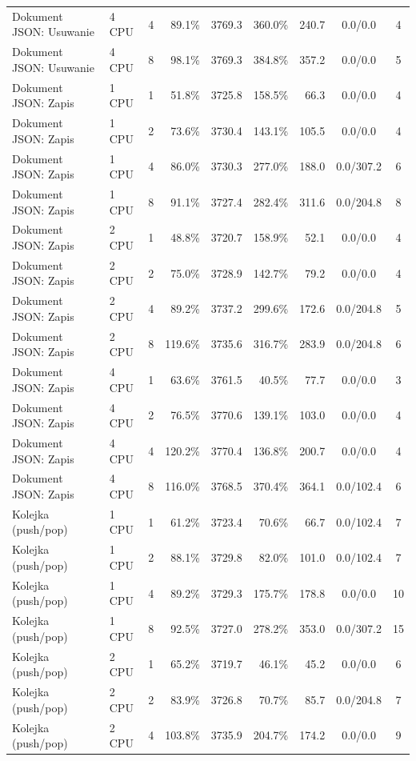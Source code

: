 \begin{table}[ht]
{\begin{tabular}{llcrrrrcc}
Dokument JSON: Usuwanie & 4 CPU & 4 & 89.1\% & 3769.3 & 360.0\% & 240.7 & 0.0/0.0 & 4 \\
Dokument JSON: Usuwanie & 4 CPU & 8 & 98.1\% & 3769.3 & 384.8\% & 357.2 & 0.0/0.0 & 5 \\
Dokument JSON: Zapis & 1 CPU & 1 & 51.8\% & 3725.8 & 158.5\% & 66.3 & 0.0/0.0 & 4 \\
Dokument JSON: Zapis & 1 CPU & 2 & 73.6\% & 3730.4 & 143.1\% & 105.5 & 0.0/0.0 & 4 \\
Dokument JSON: Zapis & 1 CPU & 4 & 86.0\% & 3730.3 & 277.0\% & 188.0 & 0.0/307.2 & 6 \\
Dokument JSON: Zapis & 1 CPU & 8 & 91.1\% & 3727.4 & 282.4\% & 311.6 & 0.0/204.8 & 8 \\
Dokument JSON: Zapis & 2 CPU & 1 & 48.8\% & 3720.7 & 158.9\% & 52.1 & 0.0/0.0 & 4 \\
Dokument JSON: Zapis & 2 CPU & 2 & 75.0\% & 3728.9 & 142.7\% & 79.2 & 0.0/0.0 & 4 \\
Dokument JSON: Zapis & 2 CPU & 4 & 89.2\% & 3737.2 & 299.6\% & 172.6 & 0.0/204.8 & 5 \\
Dokument JSON: Zapis & 2 CPU & 8 & 119.6\% & 3735.6 & 316.7\% & 283.9 & 0.0/204.8 & 6 \\
Dokument JSON: Zapis & 4 CPU & 1 & 63.6\% & 3761.5 & 40.5\% & 77.7 & 0.0/0.0 & 3 \\
Dokument JSON: Zapis & 4 CPU & 2 & 76.5\% & 3770.6 & 139.1\% & 103.0 & 0.0/0.0 & 4 \\
Dokument JSON: Zapis & 4 CPU & 4 & 120.2\% & 3770.4 & 136.8\% & 200.7 & 0.0/0.0 & 4 \\
Dokument JSON: Zapis & 4 CPU & 8 & 116.0\% & 3768.5 & 370.4\% & 364.1 & 0.0/102.4 & 6 \\
Kolejka (push/pop) & 1 CPU & 1 & 61.2\% & 3723.4 & 70.6\% & 66.7 & 0.0/102.4 & 7 \\
Kolejka (push/pop) & 1 CPU & 2 & 88.1\% & 3729.8 & 82.0\% & 101.0 & 0.0/102.4 & 7 \\
Kolejka (push/pop) & 1 CPU & 4 & 89.2\% & 3729.3 & 175.7\% & 178.8 & 0.0/0.0 & 10 \\
Kolejka (push/pop) & 1 CPU & 8 & 92.5\% & 3727.0 & 278.2\% & 353.0 & 0.0/307.2 & 15 \\
Kolejka (push/pop) & 2 CPU & 1 & 65.2\% & 3719.7 & 46.1\% & 45.2 & 0.0/0.0 & 6 \\
Kolejka (push/pop) & 2 CPU & 2 & 83.9\% & 3726.8 & 70.7\% & 85.7 & 0.0/204.8 & 7 \\
Kolejka (push/pop) & 2 CPU & 4 & 103.8\% & 3735.9 & 204.7\% & 174.2 & 0.0/0.0 & 9 \\

\end{tabular}}
\end{table}
